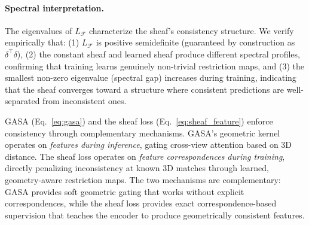 \paragraph{Spectral interpretation.} The eigenvalues of $L_\mathcal{F}$ characterize the sheaf's consistency structure. We verify empirically that: (1) $L_\mathcal{F}$ is positive semidefinite (guaranteed by construction as $\delta^\top \delta$), (2) the constant sheaf and learned sheaf produce different spectral profiles, confirming that training learns genuinely non-trivial restriction maps, and (3) the smallest non-zero eigenvalue (spectral gap) increases during training, indicating that the sheaf converges toward a structure where consistent predictions are well-separated from inconsistent ones.

\begin{remark}
GASA (Eq.~\cref{eq:gasa}) and the sheaf loss (Eq.~\cref{eq:sheaf_feature}) enforce consistency through complementary mechanisms. GASA's geometric kernel operates on \emph{features during inference}, gating cross-view attention based on 3D distance. The sheaf loss operates on \emph{feature correspondences during training}, directly penalizing inconsistency at known 3D matches through learned, geometry-aware restriction maps. The two mechanisms are complementary: GASA provides soft geometric gating that works without explicit correspondences, while the sheaf loss provides exact correspondence-based supervision that teaches the encoder to produce geometrically consistent features.
\end{remark}
